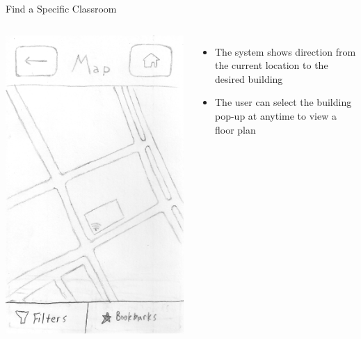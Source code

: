\documentclass{beamer}
\begin{document}
\begin{frame}{Find a Specific Classroom}
    \begin{columns}[c]
        \center\includegraphics[height=0.75 \textheight]{hand-drawn/maps.png}
        \begin{itemize}
            \item The system shows direction from the current location to the desired building
            \item The user can select the building pop-up at anytime to view a floor plan
        \end{itemize}
    \end{columns}
\end{frame}
\end{document}
